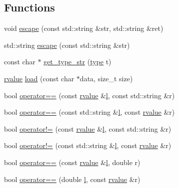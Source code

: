 \subsection*{Functions}
\begin{DoxyCompactItemize}
\item 
void \hyperlink{namespacecrow_1_1json_a98e83fcd8d2e51b3acfc99d868b4e41a}{escape} (const std\-::string \&str, std\-::string \&ret)
\item 
std\-::string \hyperlink{namespacecrow_1_1json_a27086e84491472bba7ff876c929f5df3}{escape} (const std\-::string \&str)
\item 
const char $\ast$ \hyperlink{namespacecrow_1_1json_ae63b97ba6f66ef6daf254e00a4b0facb}{get\-\_\-type\-\_\-str} (\hyperlink{namespacecrow_1_1json_adb9569a402d1b289a75025c8c96e5d99}{type} t)
\item 
\hyperlink{classcrow_1_1json_1_1rvalue}{rvalue} \hyperlink{namespacecrow_1_1json_a84a2fc9bc21a94b2791271e54879ab0a}{load} (const char $\ast$data, size\-\_\-t size)
\item 
bool \hyperlink{namespacecrow_1_1json_a516708ab016de1caa6d3203529929b2e}{operator==} (const \hyperlink{classcrow_1_1json_1_1rvalue}{rvalue} \&\hyperlink{three_8min_8js_aae3c400cfa9afd0584b6226ac3804a40}{l}, const std\-::string \&r)
\item 
bool \hyperlink{namespacecrow_1_1json_aa9ae087edb7382ba2df19bb5b4b8165b}{operator==} (const std\-::string \&\hyperlink{three_8min_8js_aae3c400cfa9afd0584b6226ac3804a40}{l}, const \hyperlink{classcrow_1_1json_1_1rvalue}{rvalue} \&r)
\item 
bool \hyperlink{namespacecrow_1_1json_a2f0451a26844bed78da38c06d18d76f7}{operator!=} (const \hyperlink{classcrow_1_1json_1_1rvalue}{rvalue} \&\hyperlink{three_8min_8js_aae3c400cfa9afd0584b6226ac3804a40}{l}, const std\-::string \&r)
\item 
bool \hyperlink{namespacecrow_1_1json_aba197bed8a4a07e34a0733d633b14e9b}{operator!=} (const std\-::string \&\hyperlink{three_8min_8js_aae3c400cfa9afd0584b6226ac3804a40}{l}, const \hyperlink{classcrow_1_1json_1_1rvalue}{rvalue} \&r)
\item 
bool \hyperlink{namespacecrow_1_1json_a1079ce699fb8174f6f4092b79ef44fc0}{operator==} (const \hyperlink{classcrow_1_1json_1_1rvalue}{rvalue} \&\hyperlink{three_8min_8js_aae3c400cfa9afd0584b6226ac3804a40}{l}, double r)
\item 
bool \hyperlink{namespacecrow_1_1json_a90cbe3f52220c2062156cf256e43c631}{operator==} (double \hyperlink{three_8min_8js_aae3c400cfa9afd0584b6226ac3804a40}{l}, const \hyperlink{classcrow_1_1json_1_1rvalue}{rvalue} \&r)

\end{DoxyCompactItemize}
